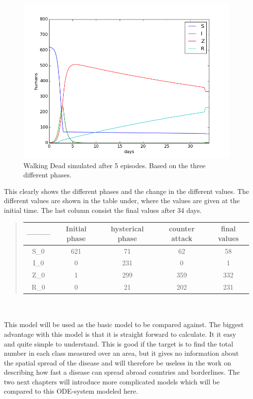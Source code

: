\documentclass[%
twoside,                 %
final,                   %
10pt]{article}
\begin{document}
\begin{figure}[ht]
  \centerline{\includegraphics[width=0.9\linewidth]{plots/WD_zombie_all_phases_1.png}}
  \caption{
  Walking Dead simulated after 5 episodes. Based on the three different phases.
  }
\end{figure}


This clearly shows the different phases and the change in the different values. The different values are shown in the table under, where the values are given at the initial time. The last column consist the final values after 34 days.

\begin{quote}
\begin{tabular}{ccccc}
\hline
\multicolumn{1}{c}{ --------- } & \multicolumn{1}{c}{ Initial phase } & \multicolumn{1}{c}{ hysterical phase } & \multicolumn{1}{c}{ counter attack } & \multicolumn{1}{c}{ final values } \\
\hline
S_0              & 621              & 71               & 62               & 58               \\
I_0              & 0                & 231              & 0                & 1                \\
Z_0              & 1                & 299              & 359              & 332              \\
R_0              & 0                & 21               & 202              & 231              \\
\hline
\end{tabular}
\end{quote}

\noindent
\\
\\
This model will be used as the basic model to be compared against. The biggest advantage with this model is that it is straight forward to calculate. It it easy and quite simple to understand. This is good if the target is to find the total number in each class measured over an area, but it gives no information about the spatial spread of the disease and will therefore be useless in the work on describing how fast a disease can spread abroad countries and borderlines. The  two next chapters will introduce more complicated models which will be compared to this ODE-system modeled here.








\printindex
\end{document}
